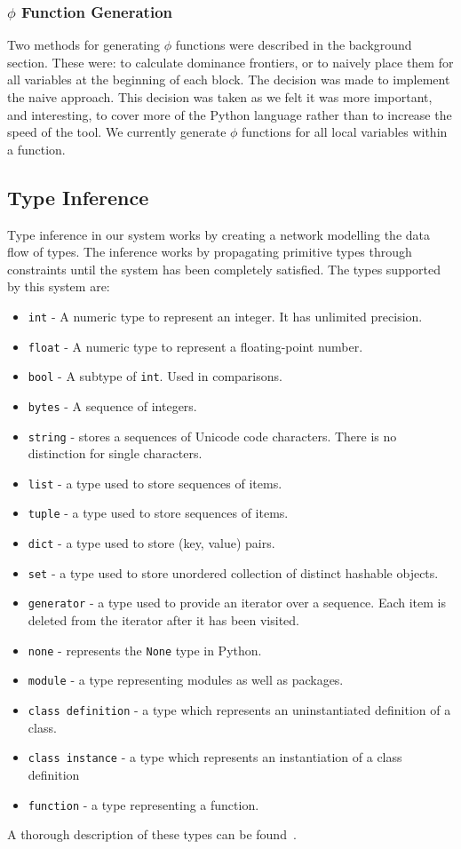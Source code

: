 \documentclass[12pt, titlepage]{article}
\begin{document}
\subsubsection{$\phi$ Function Generation}
Two methods for generating $\phi$ functions were described in the background section. These were: to calculate dominance frontiers, or to naively place them for all variables at the beginning of each block. The decision was made to implement the naive approach. This decision was taken as we felt it was more important, and interesting, to cover more of the Python language rather than to increase the speed of the tool. We currently generate $\phi$ functions for all local variables within a function.

\subsection{Type Inference}
Type inference in our system works by creating a network modelling the data flow of types. The inference works by propagating primitive types through constraints until the system has been completely satisfied. The types supported by this system are:
\begin{itemize}
	\item \texttt{int} - A numeric type to represent an integer. It has unlimited precision.
	\item \texttt{float} - A numeric type to represent a floating-point number.
	\item \texttt{bool} - A subtype of \texttt{int}. Used in comparisons.
	\item \texttt{bytes} - A sequence of integers.
	\item \texttt{string} - stores a sequences of Unicode code characters. There is no distinction for single characters.
	\item \texttt{list} - a type used to store sequences of items.
	\item \texttt{tuple} - a type used to store sequences of items.
	\item \texttt{dict} - a type used to store (key, value) pairs.
	\item \texttt{set} - a type used to store unordered collection of distinct hashable objects.
	\item \texttt{generator} - a type used to provide an iterator over a sequence. Each item is deleted from the iterator after it has been visited.
	\item \texttt{none} - represents the \texttt{None} type in Python.
	\item \texttt{module} - a type representing modules as well as packages.
	\item \texttt{class definition} - a type which represents an uninstantiated definition of a class.
	\item \texttt{class instance} - a type which represents an instantiation of a class definition
	\item \texttt{function} - a type representing a function.
\end{itemize}
A thorough description of these types can be found~\cite{pythonTypeDocs}. \\
\end{document}
